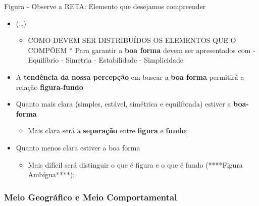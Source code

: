 \documentclass[
]{book}
\providecommand{\tightlist}{%
  \setlength{\itemsep}{0pt}\setlength{\parskip}{0pt}}
\begin{document}
Figura - Observe a RETA: Elemento que desejamos compreender

\begin{itemize}
\tightlist
\item
  (\ldots)

  \begin{itemize}
  \tightlist
  \item
    COMO DEVEM SER DISTRIBUÍDOS OS ELEMENTOS QUE O COMPÕEM * Para
    garantir a \textbf{boa forma} devem ser apresentados com -
    Equilíbrio - Simetria - Estabilidade - Simplicidade
  \end{itemize}
\item
  A \textbf{tendência da nossa percepção} em buscar a \textbf{boa forma}
  permitirá a relação \textbf{figura-fundo}
\item
  Quanto mais clara (simples, estável, simétrica e equilibrada) estiver
  a \textbf{boa-forma}

  \begin{itemize}
  \tightlist
  \item
    Mais clara será a \textbf{separação} entre \textbf{figura} e
    \textbf{fundo};
  \end{itemize}
\item
  Quanto menos clara estiver a boa forma

  \begin{itemize}
  \tightlist
  \item
    Mais difícil será distinguir o que é figura e o que é fundo
    (****Figura Ambígua****);
  \end{itemize}
\end{itemize}

\hypertarget{meio-geogruxe1fico-e-meio-comportamental}{%
\subsubsection{Meio Geográfico e Meio
Comportamental}\label{meio-geogruxe1fico-e-meio-comportamental}}
\end{document}
